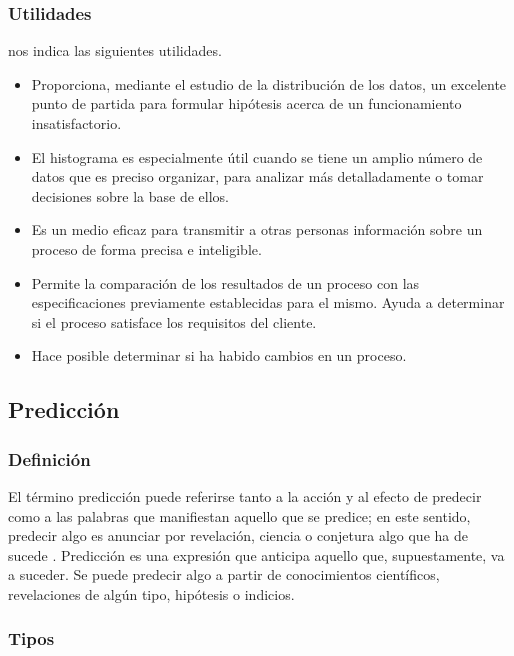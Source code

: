 \vskip 1cm 
\subsubsection{Utilidades}
\cite{histograma_tipos} nos indica las siguientes utilidades.
\begin{itemize}
	\item Proporciona, mediante el estudio de la distribución de los datos, un excelente punto de partida para formular hipótesis acerca de un funcionamiento insatisfactorio.
	\item El histograma es especialmente útil cuando se tiene un amplio número de datos que es preciso organizar, para analizar más detalladamente o tomar decisiones sobre la base de ellos.
	\item Es un medio eficaz para transmitir a otras personas información sobre un proceso de forma precisa e inteligible.
	\item Permite la comparación de los resultados de un proceso con las especificaciones previamente establecidas para el mismo. Ayuda a determinar si el proceso satisface los requisitos del cliente.
	\item Hace posible determinar si ha habido cambios en un proceso.
	
\end{itemize}


\subsection{Predicción}

\subsubsection{Definición}

El término predicción puede referirse tanto a la acción y al efecto de predecir como a las palabras que manifiestan aquello que se predice; en este sentido, predecir algo es anunciar por revelación, ciencia o conjetura algo que ha de sucede \citep{rae_prediccion}.
\vskip 0.2cm 
Predicción es una expresión que anticipa aquello que, supuestamente, va a suceder. Se puede predecir algo a partir de conocimientos científicos, revelaciones de algún tipo, hipótesis o indicios.

\subsubsection{Tipos}

